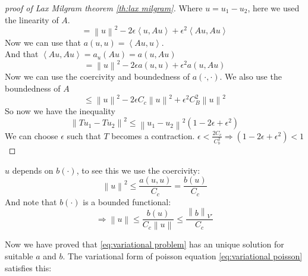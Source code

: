 \documentclass[../Main/main.tex]{subfiles}
\begin{document}
\begin{proof}[proof of Lax Milgram theorem \ref{th:lax milgram}]
		Where $u = u_1 - u_2$, here we used the linearity of $A$.
		\begin{equation*}
			=\left \| u \right \|^2 - 2 \epsilon \left \langle u,Au \right \rangle + \epsilon^2 \left \langle Au,Au \right\rangle
		\end{equation*}
		Now we can use that $a(u,u)=\left \langle Au,u \right \rangle$.\\
		And that $\left \langle Au,Au \right \rangle = a_u(Au) = a(u,Au)$ 
		\begin{equation*}
			=\left \| u \right \|^2 - 2\epsilon a(u,u) + \epsilon^2 a(u,Au)
		\end{equation*}
		Now we can use the coercivity and boundedness of $a(\cdot,\cdot)$. We also use the boundedness of $A$
		\begin{equation*}
			\leq \left \|u  \right \|^2 -2\epsilon C_c \left \| u \right \|^2 + \epsilon^2 C_B^2 \left \|u  \right \|^2
		\end{equation*}
		So now we have the inequality
		\begin{equation*}
			\left \| Tu_1 -Tu_2 \right \|^2 \leq \left \| u_1 - u_2 \right \|^2 (1-2\epsilon + \epsilon^2)
		\end{equation*}
		We can choose $\epsilon$ such that $T$ becomes a contraction.
		$\epsilon < \frac{2 C_c}{C_b^2} \Rightarrow (1-2\epsilon + \epsilon^2)<1$
	\end{proof}
	\begin{remark}\label{rm:stability}
		$u$ depends on $b(\cdot)$, to see this we use the coercivity:
		\begin{equation*}
			\left \| u \right \|^2 \leq \frac{a(u,u)}{C_c} = \frac{b(u)}{C_c}
		\end{equation*}
		And note that $b(\cdot)$ is a bounded functional:
		\begin{equation*}
			\Rightarrow \left \| u \right \| \leq \frac{b(u)}{C_c \left \|u\right \|} \leq \frac{\left \| b \right \|_{V'}}{C_c}
		\end{equation*}
	\end{remark}
	Now we have proved that \eqref{eq:variational problem} has an unique solution for suitable $a$ and $b$. The variational form of poisson equation \eqref{eq:variational poisson} satisfies this:
\end{document}
